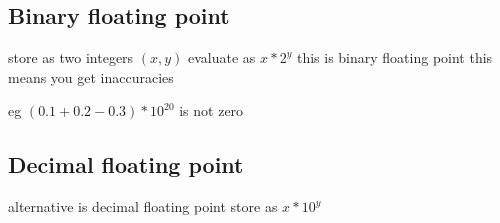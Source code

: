 
\subsection{Binary floating point}

store as two integers \((x,y)\)
evaluate as \(x*2^y\)
this is binary floating point
this means you get inaccuracies

eg \((0.1+0.2-0.3)*10^{20}\) is not zero

\subsection{Decimal floating point}
alternative is decimal floating point
store as \(x*10^y\)

